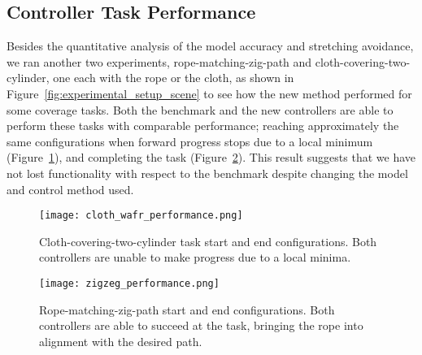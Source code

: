 




\subsection{Controller Task Performance} \label{Results:Controller Task Performance}

Besides the quantitative analysis of the model accuracy and stretching avoidance, we ran another two experiments, rope-matching-zig-path and cloth-covering-two-cylinder, one each with the rope or the cloth, as shown in Figure~\ref{fig:experimental_setup_scene} to see how the new method performed for some coverage tasks. Both the benchmark and the new controllers are able to perform these tasks with comparable performance; reaching approximately the same configurations when forward progress stops due to a local minimum (Figure~\ref{fig:cloth_wafr_performance}), and completing the task (Figure~\ref{fig:zigzeg_performance}). This result suggests that we have not lost functionality with respect to the benchmark despite changing the model and control method used.


\begin{figure}[t]
    \centering
    \texttt{[image: cloth\_wafr\_performance.png]}
    \caption{Cloth-covering-two-cylinder task start and end configurations. Both controllers are unable to make progress due to a local minima.}
    \label{fig:cloth_wafr_performance}
\end{figure}


\begin{figure}[t]
    \centering
    \texttt{[image: zigzeg\_performance.png]}
    \caption{Rope-matching-zig-path start and end configurations. Both controllers are able to succeed at the task, bringing the rope into alignment with the desired path.}
    \label{fig:zigzeg_performance}
\end{figure}



